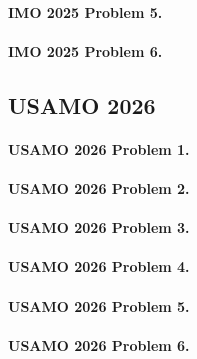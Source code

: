 \paragraph{IMO 2025 Problem 5.}


\paragraph{IMO 2025 Problem 6.}


\subsection{USAMO 2026}
\vspace{1em}
\paragraph{USAMO 2026 Problem 1.}


\paragraph{USAMO 2026 Problem 2.}


\paragraph{USAMO 2026 Problem 3.}


\paragraph{USAMO 2026 Problem 4.}


\paragraph{USAMO 2026 Problem 5.}


\paragraph{USAMO 2026 Problem 6.}


\endgroup
